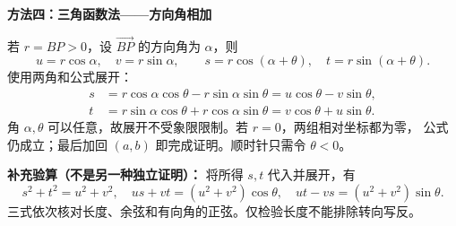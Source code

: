 \clearpage
\begin{proofbox}
\textbf{方法四：三角函数法——方向角相加}

若 $r=BP>0$，设 $\overrightarrow{BP}$ 的方向角为 $\alpha$，则
\[
u=r\cos\alpha,\quad v=r\sin\alpha,\qquad
s=r\cos(\alpha+\theta),\quad t=r\sin(\alpha+\theta).
\]
使用两角和公式展开：
\[
\begin{aligned}
s&=r\cos\alpha\cos\theta-r\sin\alpha\sin\theta
=u\cos\theta-v\sin\theta,\\
t&=r\sin\alpha\cos\theta+r\cos\alpha\sin\theta
=v\cos\theta+u\sin\theta.
\end{aligned}
\]
角 $\alpha,\theta$ 可以任意，故展开不受象限限制。若 $r=0$，两组相对坐标都为零，
公式仍成立；最后加回 $(a,b)$ 即完成证明。顺时针只需令 $\theta<0$。

\textbf{补充验算（不是另一种独立证明）：}
将所得 $s,t$ 代入并展开，有
\[
s^2+t^2=u^2+v^2,\quad
us+vt=(u^2+v^2)\cos\theta,\quad
ut-vs=(u^2+v^2)\sin\theta.
\]
三式依次核对长度、余弦和有向角的正弦。仅检验长度不能排除转向写反。
\end{proofbox}
